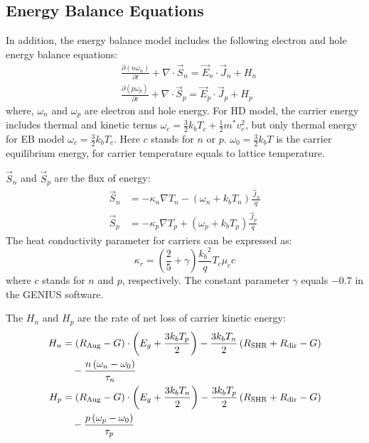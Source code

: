 \documentclass[oneside,12pt]{cgd_book}
\begin{document}
\subsection{Energy Balance Equations}\label{Energy-balance equation+EBML3}In addition, the energy balance model includes the following electron and hole energy balance
        equations:
\begin{subequations}
\begin{align}
 &\frac{\partial \left( {n\omega _n } \right)} {\partial t} + \nabla \cdot \vec{S}_n  = \vec{E}_n \cdot
        \vec{J}_n +H_n\\
 &\frac{\partial \left( {p\omega _p } \right)} {\partial t} + \nabla \cdot \vec{S}_p = \vec{E}_p \cdot
        \vec{J}_p +H_p
\end{align}
\end{subequations}
where, $\omega _n$ and $\omega _p$ are electron and
      hole energy. For HD model, the carrier energy includes thermal and kinetic terms
$\omega _c =
      \frac{3}{2}k_bT_c + \frac{1}{2}m^* v_c^2$, but only thermal energy for EB model
$\omega _c = \frac{3}{2}k_bT_c$. Here $c$ stands for $n$ or $p$.
$\omega_0=\frac{3}{2}k_bT$ is the carrier equilibrium energy, for carrier temperature equals to lattice temperature.
\par
$\vec{S}_n$ and $\vec{S}_p$ are the flux of
      energy:
\begin{subequations}
\begin{align}
 \vec{S}_n & = - \kappa _n \nabla T_n - \left( \omega_n + k_b T_n \right) \frac{\vec{J}_n} {q}\\
 \vec{S}_p & = - \kappa _p \nabla T_p + \left( \omega_p + k_b T_p \right) \frac{\vec{J}_p} {q}
\end{align}
\end{subequations}
The heat conductivity parameter for carriers can be expressed as:
\begin{equation}
\kappa_c=(\frac{2}{5}+\gamma)\frac{{k_b}^2}{q}T_c\mu_cc
\end{equation}
where $c$ stands for $n$ and $p$, respectively. The constant parameter
$\gamma$ equals $-0.7$ in the GENIUS software.
\par
The $H_n$ and $H_p$ are the rate of net loss of
      carrier kinetic energy:
\begin{subequations}
\begin{align}
 H_n &=  \left( R_{\rm Aug} - G \right) \cdot \left( E_g + \frac{3k_b T_p } {2} \right) -
        \frac{3k_b T_n } {2}\left( R_{\rm SHR} + R_{\rm dir} - G \right) \nonumber\\
  &\quad-\frac{{n\left( {\omega _n - \omega _0 } \right)}}{{\tau _n }}\\
 H_p &=  \left( R_{\rm Aug} - G \right) \cdot \left( E_g + \frac{3k_b T_n } {2} \right) -
        \frac{3k_b T_p}{2}\left( R_{\rm SHR} + R_{\rm dir} - G \right) \nonumber\\
 &\quad- \frac{p\left( \omega _p - \omega _0 \right)}{\tau _p }
\end{align}
\end{subequations}
\end{document}
